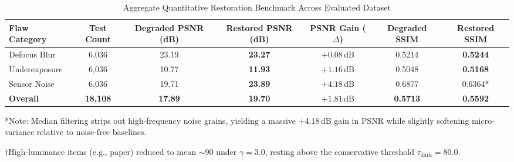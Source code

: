 \documentclass[conference]{IEEEtran}
\begin{document}
\begin{table}[htbp]
\caption{Aggregate Quantitative Restoration Benchmark Across Evaluated Dataset}
\label{tab:benchmark}
\centering
\begin{tabular}{@{}lcccccc@{}}
\toprule
\textbf{Flaw Category} & \textbf{Test Count} & \textbf{Degraded PSNR (dB)} & \textbf{Restored PSNR (dB)} & \textbf{PSNR Gain ($\Delta$)} & \textbf{Degraded SSIM} & \textbf{Restored SSIM} \\ \midrule
Defocus Blur           & 6,036               & 23.19                       & \textbf{23.27}              & $+0.08$\,dB                    & 0.5214                 & \textbf{0.5244}        \\
Underexposure          & 6,036               & 10.77                       & \textbf{11.93}              & $+1.16$\,dB                    & 0.5048                 & \textbf{0.5168}        \\
Sensor Noise           & 6,036               & 19.71                       & \textbf{23.89}              & $\mathbf{+4.18}$\,dB           & 0.6877                 & 0.6364*                \\ \midrule
\textbf{Overall}       & \textbf{18,108}     & \textbf{17.89}              & \textbf{19.70}              & $\mathbf{+1.81}$\,dB           & \textbf{0.5713}        & \textbf{0.5592}        \\ \bottomrule
\end{tabular}
\vspace{0.1cm}
\begin{flushleft}
\footnotesize{*Note: Median filtering strips out high-frequency noise grains, yielding a massive $+4.18$\,dB gain in PSNR while slightly softening micro-variance relative to noise-free baselines.}
\end{flushleft}
\end{table}

\begin{table}[htbp]
\caption{Diagnostic Triage Routing Confusion Matrix}
\label{tab:routing}
\centering
{}
\vspace{0.1cm}
\begin{flushleft}
\footnotesize{$\dagger$High-luminance items (e.g., paper) reduced to mean $\sim 90$ under $\gamma=3.0$, resting above the conservative threshold $\tau_{\text{dark}}=80.0$.}
\end{flushleft}
\end{table}
\end{document}
